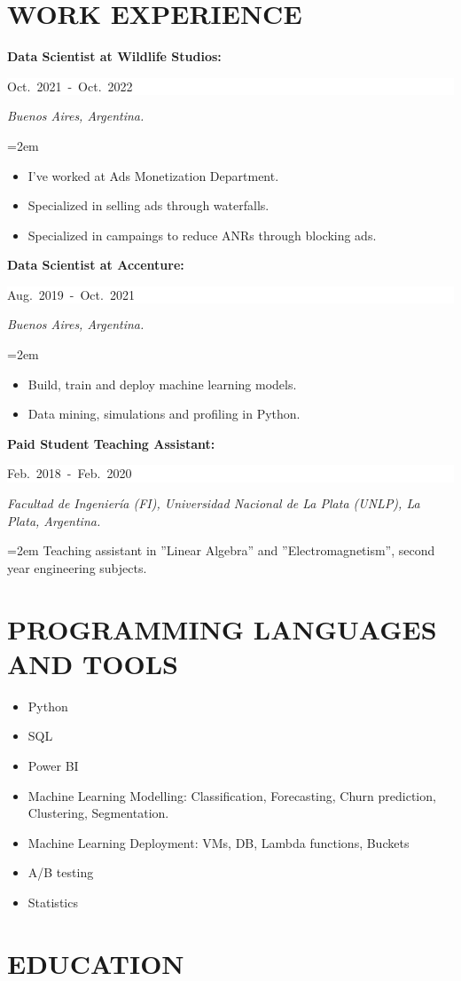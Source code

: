 \documentclass[paper=letter,fontsize=11pt]{scrartcl} %
\newcommand{\sepspace}{\vspace*{1em}}		%
\newcommand{\NewPart}[2]{\section*{\uppercase{#1} \small \normalfont #2}}
\newcommand{\WorkEntry}[5]{
		\noindent \textbf{#1}
        \noindent \small \textit{#2}
        \hfill      %
        \colorbox{White}{%
			\parbox{6em}{%
			\hfill\color{Black}#3}} \par  %
		\noindent \textit{#4} \par        %
		\noindent\hangindent=2em\hangafter=0 \small #5 %
		\normalsize \par}
\begin{document}
\sepspace


\NewPart{Work Experience}{}

\sepspace

\WorkEntry{Data Scientist at Wildlife Studios:}
{}{\hbox{Oct. 2021 - Oct. 2022}}
{Buenos Aires, Argentina.}
{
\begin{itemize}
	\item I've worked at Ads Monetization Department.
	\item Specialized in selling ads through waterfalls.
	\item Specialized in campaings to reduce ANRs through blocking ads.
\end{itemize}
}



\WorkEntry{Data Scientist at Accenture:}
{}{\hbox{Aug. 2019 - Oct. 2021}}
{Buenos Aires, Argentina.}
{
\begin{itemize}
	\item Build, train and deploy machine learning models.
	\item Data mining, simulations and profiling in Python.
\end{itemize}
}

\sepspace

\WorkEntry{Paid Student Teaching Assistant:}
{}{\hbox{Feb. 2018 - Feb. 2020}}
{Facultad de Ingeniería (FI), Universidad Nacional de La Plata (UNLP), La Plata, Argentina.}
{
Teaching assistant in ”Linear Algebra” and ”Electromagnetism”, second year engineering subjects.
}

\sepspace

\NewPart{PROGRAMMING LANGUAGES AND TOOLS}{}

\begin{itemize}
\item Python
\item SQL
\item Power BI
\item Machine Learning Modelling: Classification, Forecasting, Churn prediction, Clustering, Segmentation.
\item Machine Learning Deployment: VMs, DB, Lambda functions, Buckets
\item A/B testing
\item Statistics
\end{itemize}



\NewPart{Education}{}
\end{document}
